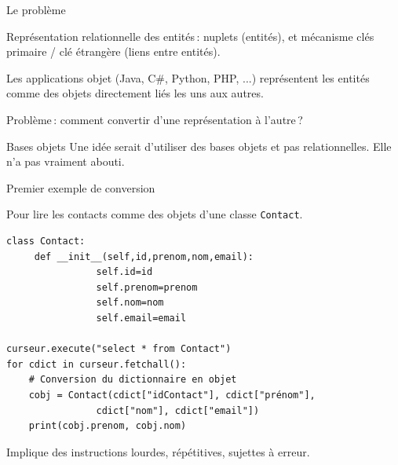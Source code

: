 

\begin{frame}[fragile]{Le problème}

Représentation relationnelle  des entités\,: nuplets (entités),
et mécanisme clés primaire / clé étrangère (liens entre entités).

 
\vfill

Les applications objet (Java, C\#, Python, PHP, ...) représentent les entités
comme des \alert{objets} directement liés les uns aux autres.


\vfill

\alert{Problème}\,: comment \alert{convertir}  d'une représentation à l'autre\,?


\begin{blocgauche}
\begin{remblock}{Bases objets}
Une idée serait d'utiliser des bases \alert{objets} et
pas relationnelles. Elle n'a pas vraiment abouti.
\end{remblock}

\end{blocgauche}
\end{frame}


\begin{frame}[fragile]{Premier exemple de conversion}

Pour lire les contacts comme des objets d'une classe \texttt{Contact}.

\vfill

\begin{verbatim}
class Contact:
     def __init__(self,id,prenom,nom,email):
                self.id=id
                self.prenom=prenom
                self.nom=nom
                self.email=email

curseur.execute("select * from Contact")
for cdict in curseur.fetchall():
    # Conversion du dictionnaire en objet
    cobj = Contact(cdict["idContact"], cdict["prénom"], 
                cdict["nom"], cdict["email"])
    print(cobj.prenom, cobj.nom)
\end{verbatim}


\vfill

\begin{blocgauche}
Implique des instructions lourdes, répétitives,
sujettes à erreur.
\end{blocgauche}
\end{frame}


